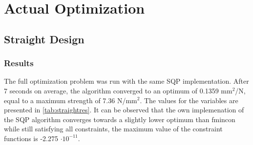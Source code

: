 
\section{Actual Optimization}
\subsection{Straight Design}

\subsubsection{Results}
The full optimization problem was run with the same SQP implementation. After 7 seconds on average, the algorithm converged to an optimum of 0.1359 mm$^2$/N, equal to a maximum strength of 7.36 N/mm$^2$. The values for the variables are presented in \autoref{tab:straightres}. It can be observed that the own implemenation of the SQP algorithm converges towards a slightly lower optimum than fmincon while still satisfying all constraints, the maximum value of the constraint functions is -2.275 $\cdot 10^{-11}$.



